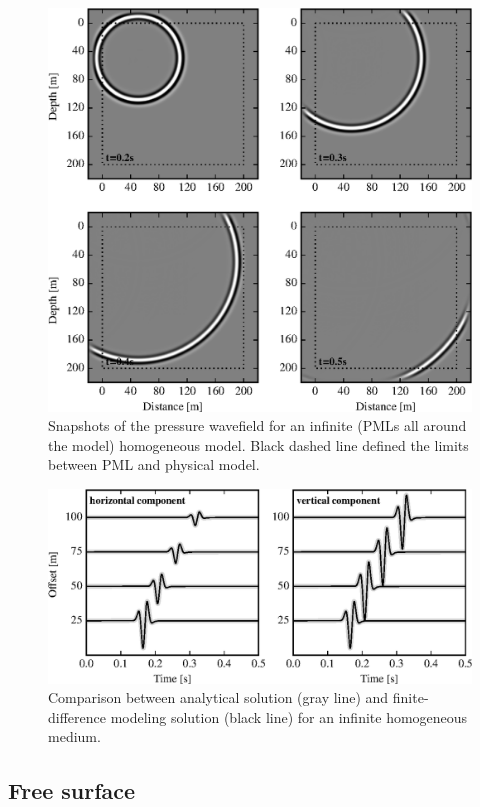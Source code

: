 \documentclass{gnulike}
\begin{document}
\begin{figure}[!ht]
  \centering
  \includegraphics[width=0.9\columnwidth]{fig/validation_snap_pml.eps}
  \caption{Snapshots of the pressure wavefield for an infinite (PMLs all around the model) homogeneous model. Black dashed line defined the limits between PML and physical model.}
  \label{fig:validation-pml}
\end{figure}

\begin{figure}[!ht]
  \centering
  \includegraphics[width=0.9\columnwidth]{fig/validation_trac_pml.eps}
  \caption{Comparison between analytical solution (gray line) and finite-difference modeling solution (black line) for an infinite homogeneous medium.}
  \label{fig:validation_trac_pml}
\end{figure}

\subsection{Free surface}
\end{document}
